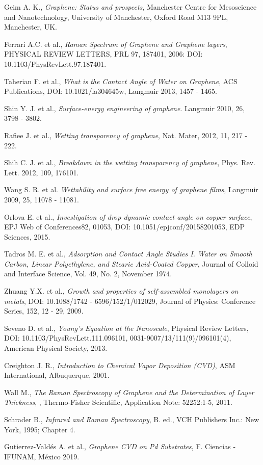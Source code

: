 \documentclass[twocolumn,letterpaper,aps,pra,10pt]{revtex4-1}
\begin{document}
\begin{thebibliography}{99}
 Geim A. K., \textit{Graphene: Status and prospects}, Manchester Centre for Mesoscience and Nanotechnology, University of Manchester,  Oxford Road M13 9PL, Manchester, UK.

 Ferrari A.C. et al., \textit{Raman Spectrum of Graphene and Graphene layers}, PHYSICAL REVIEW LETTERS, PRL 97, 187401, 2006: DOI: 10.1103/PhysRevLett.97.187401.

 Taherian F. et al., \textit{What is the Contact Angle of Water on Graphene}, ACS Publications, DOI: 10.1021/la304645w, Langmuir 2013, 1457 - 1465.

 Shin Y. J. et al., \textit{Surface-energy engineering of graphene}. Langmuir 2010, 26, 3798 - 3802.

 Rafiee J. et al., \textit{Wetting transparency of graphene}, Nat. Mater, 2012, 11, 217 - 222.

 Shih C. J. et al., \textit{Breakdown in the wetting transparency of graphene}, Phys. Rev. Lett. 2012, 109, 176101.

 Wang S. R. et al. \textit{Wettability and surface free energy of graphene films}, Langmuir 2009, 25, 11078 - 11081.

 Orlova E. et al., \textit{Investigation of drop dynamic contact angle on copper surface}, EPJ Web of Conferences82, 01053, DOI: 10.1051/epjconf/20158201053,  EDP Sciences, 2015.

 Tadros M. E. et al., \textit{Adsorption and Contact Angle Studies I. Water on Smooth Carbon, Linear Polyethylene, and Stearic Acid-Coated Copper}, Journal of Colloid and Interface Science, Vol. 49, No. 2, November 1974.

 Zhuang Y.X. et al., \textit{Growth and properties of self-assembled monolayers on metals}, DOI: 10.1088/1742 - 6596/152/1/012029, Journal of Physics: Conference Series, 152, 12 - 29, 2009.

 Seveno D. et al., \textit{Young's Equation at the Nanoscale}, Physical Review Letters, DOI: 10.1103/PhysRevLett.111.096101, 0031-9007/13/111(9)/096101(4), American Physical Society, 2013.

 Creighton J. R., \textit{Introduction to Chemical Vapor Deposition (CVD)}, ASM International, Albuquerque, 2001.

 Wall M., \textit{The Raman Spectroscopy of Graphene and the Determination of Layer Thickness}, , Thermo-Fisher Scientific, Application Note: 52252:1-5, 2011.

 Schrader B., \textit{Infrared and Raman Spectroscopy}, B. ed., VCH Publishers Inc.: New York, 1995; Chapter 4.

 Gutierrez-Valdés A. et al., \textit{Graphene CVD on Pd Substrates}, F. Ciencias - IFUNAM, México 2019.

\end{thebibliography}
\end{document}
